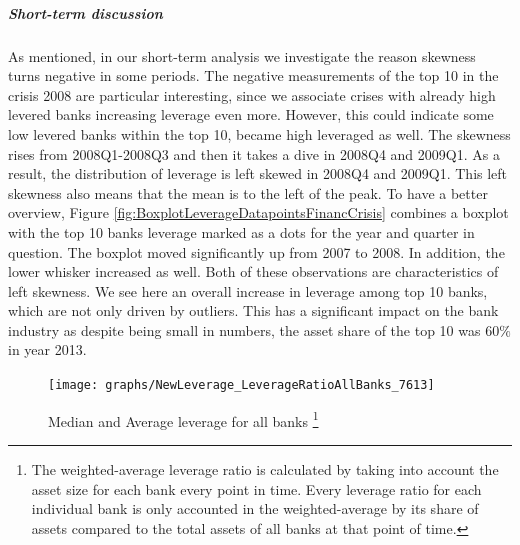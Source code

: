 \documentclass[12pt, a4paper]{article} %
\begin{document}
\subparagraph{Short-term discussion} 

As mentioned, in our short-term analysis we investigate the reason skewness turns negative in some periods. The negative measurements of the top 10 in the crisis 2008 are particular interesting, since we associate crises with already high levered banks increasing leverage even more. However, this could indicate some low levered banks within the top 10, became high leveraged as well.
The skewness rises from 2008Q1-2008Q3 and then it takes a dive in 2008Q4 and 2009Q1. As a result, the distribution of leverage is left skewed in 2008Q4 and 2009Q1. 
This left skewness also means that the mean is to the left of the peak. To have a better overview, Figure \ref{fig:BoxplotLeverageDatapointsFinancCrisis} combines a boxplot with the top 10 banks leverage marked as a dots for the year and quarter in question. The boxplot moved significantly up from 2007 to 2008. In addition, the lower whisker increased as well. Both of these observations are characteristics of left skewness. We see here an overall increase in leverage among top 10 banks, which are not only driven by outliers. This has a significant impact on the bank industry as despite being small in numbers, the asset share of the top 10 was $60\%$ in year 2013. 

\begin{figure}[hbtp]
\begin{minipage}{\textwidth}
\centering
\caption[1]{Median and Average leverage for all banks \footnote{The weighted-average leverage ratio is calculated by taking into account the asset size for each bank every point in time. Every leverage ratio for each individual bank is only accounted in the weighted-average by its share of assets compared to the total assets of all banks at that point of time.}}
\texttt{[image: graphs/NewLeverage\_LeverageRatioAllBanks\_7613]}
\label{fig:averageLeverage}
\end{minipage}
\end{figure}

\end{document}
